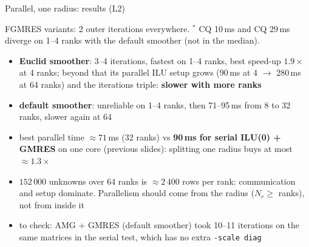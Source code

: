 \begin{frame}{Parallel, one radius: results (L2)}
    \footnotesize
    \begin{center}
    \end{center}
    \vspace{-0.4em}
    {\scriptsize FGMRES variants: 2 outer iterations everywhere.
    $^*$ CQ 10\,ms and CQ 29\,ms diverge on 1--4 ranks with the default smoother (not in the median).}
    \begin{itemize}
        \item \textbf{Euclid smoother}: 3--4 iterations, fastest on 1--4 ranks, best speed-up $1.9\times$ at 4 ranks;
              beyond that its parallel ILU setup grows (90\,ms at 4 $\to$ 280\,ms at 64 ranks) and the
              iterations triple: \textbf{slower with more ranks}
        \item \textbf{default smoother}: unreliable on 1--4 ranks, then 71--95\,ms from 8 to 32 ranks,
              slower again at 64
        \item best parallel time $\approx 71$\,ms (32 ranks) vs \textbf{90\,ms for serial ILU(0) + GMRES} on one core
              (previous slides): splitting one radius buys at most $\approx 1.3\times$
        \item $152\,000$ unknowns over 64 ranks is $\approx 2\,400$ rows per rank: communication and
              setup dominate. Parallelism should come from the radius ($N_r \geq$ ranks), not from inside it
        \item to check: AMG + GMRES (default smoother) took 10--11 iterations on the same matrices in the
              serial test, which has no extra \texttt{-scale diag}
    \end{itemize}
\end{frame}


